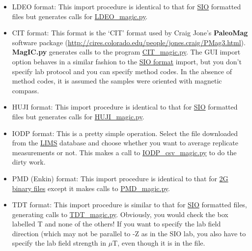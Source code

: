 \documentclass[11pt]{book}
\begin{document}
{\begin{itemize}
\item LDEO format:  This import procedure is identical to that for \href{#SIO}{SIO} formatted files but generates calls for \href{#LDEO_magic.py}{LDEO\_magic.py}. 
\item CIT format:   This format is the `CIT' format used by Craig Jone's {\bf PaleoMag} software package (\url{http://cires.colorado.edu/people/jones.craig/PMag3.html}).   {\bf MagIC.py} generates calls to the program \href{#CIT_magic.py}{CIT\_magic.py}.       The GUI import option behaves in a similar fashion to the \href{#SIO}{SIO format} import, but you don't specify lab protocol and you can specify method codes.  In the absence of method codes, it is assumed the samples were oriented with magnetic compass.  

\item HUJI format:  This import procedure is identical to that for \href{#SIO}{SIO} formatted files  but generates calls for \href{#HUJI_magic.py}{HUJI\_magic.py}. 
\item IODP format:    This is a pretty simple operation.  Select the file downloaded from the  \href{#LIMS} {LIMS} database and choose whether you want to average replicate measurements or not.  This makes a call to \href{#IODP_csv_magic.py}{IODP\_csv\_magic.py} to do the dirty work.  

\item PMD (Enkin) format:  This import procedure is identical to that for \href{#2G-bin}{2G binary files} except it makes calls to \href{#PMD_magic.py}{PMD\_magic.py}.

\item TDT format:  This import procedure is similar to that for \href{#SIO}{SIO} formatted files, generating calls to \href{#TDT_magic.py}{TDT\_magic.py}.  Obviously, you would check the box labelled T and none of the others!   If you want to specify the lab field direction (which may not be parallel to -Z as in the SIO lab, you also have to specify the lab field strength in $\mu$T, even though it is in the file.  

\end{itemize}






}
\end{document}
